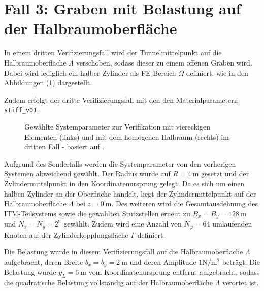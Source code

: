 \section{Fall 3: Graben mit Belastung auf der Halbraumoberfläche}
\label{sec:verification_c3}

In einem dritten Verifizierungsfall wird der Tunnelmittelpunkt auf die Halbraumoberfläche $\Lambda$ verschoben, sodass dieser zu einem offenen Graben wird. Dabei wird lediglich ein halber Zylinder als FE-Bereich $\Omega$ definiert, wie in den Abbildungen (\ref{fig:c3_systeme}) dargestellt.

Zudem erfolgt der dritte Verifizierungsfall mit den den Materialparametern \texttt{stiff\_v01}.
\begin{figure}[H]
	\centering
	\begin{subfigure}[t]{0.49\linewidth}
		\centering
		
	\end{subfigure}\hfill
	\begin{subfigure}[t]{0.49\linewidth}
		\centering
		
	\end{subfigure}
	\caption{Gewählte Systemparameter zur Verifikation mit viereckigen Elementen (links) und mit dem homogenen Halbraum (rechts) im dritten Fall - basiert auf \cite{Freisinger2022}.}
	\label{fig:c3_systeme}
\end{figure}
Aufgrund des Sonderfalls werden die Systemparameter von den vorherigen Systemen abweichend gewählt.
Der Radius wurde auf $R = 4\ \mathrm{m}$ gesetzt und der Zylindermittelpunkt in den Koordinatenursprung gelegt. Da es sich um einen halben Zylinder an der Oberfläche handelt, liegt der Zylindermittelpunkt auf der Halbraumoberfläche $\Lambda$ bei $z = 0\ \mathrm{m}$.
Des weiteren wird die Gesamtausdehnung des ITM-Teilsystems sowie die gewählten Stützstellen erneut zu $B_x = B_y = 128\ \mathrm{m}$ und $N_x = N_y = 2^{9}$ gewählt.
Zudem wird eine Anzahl von $N_{\varphi} = 64$ umlaufenden Knoten auf der Zylinderkopplungsfläche $\Gamma$ definiert.

Die Belastung wurde in diesem Verifizierungsfall auf die Halbraumoberfläche $\Lambda$ aufgebracht, deren Breite $b_x = b_y = 2\ \mathrm{m}$ und deren Amplitude $1 \mathrm{N}/\mathrm{m}^{2}$ beträgt. Die Belastung wurde $y_L = 6\ \mathrm{m}$ vom Koordinatenursprung entfernt aufgebracht, sodass die quadratische Belastung vollständig auf der Halbraumoberfläche $\Lambda$ verortet ist. 


